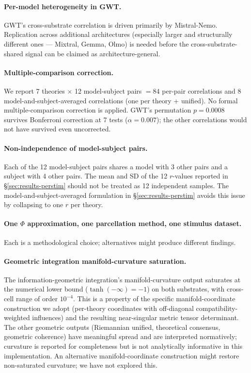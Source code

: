 \documentclass[11pt,a4paper]{article}
\begin{document}
\paragraph{Per-model heterogeneity in GWT.} GWT's cross-substrate correlation is driven primarily by Mistral-Nemo. Replication across additional architectures (especially larger and structurally different ones --- Mixtral, Gemma, Olmo) is needed before the cross-substrate-shared signal can be claimed as architecture-general.

\paragraph{Multiple-comparison correction.} We report 7 theories $\times$ 12 model-subject pairs $= 84$ per-pair correlations and 8 model-and-subject-averaged correlations (one per theory + unified). No formal multiple-comparison correction is applied. GWT's permutation $p = 0.0008$ survives Bonferroni correction at 7 tests ($\alpha = 0.007$); the other correlations would not have survived even uncorrected.

\paragraph{Non-independence of model-subject pairs.} Each of the 12 model-subject pairs shares a model with 3 other pairs and a subject with 4 other pairs. The mean and SD of the 12 $r$-values reported in \S\ref{sec:results-perstim} should not be treated as 12 independent samples. The model-and-subject-averaged formulation in \S\ref{sec:results-perstim} avoids this issue by collapsing to one $r$ per theory.

\paragraph{One $\Phi$ approximation, one parcellation method, one stimulus dataset.} Each is a methodological choice; alternatives might produce different findings.

\paragraph{Geometric integration manifold-curvature saturation.} The information-geometric integration's manifold-curvature output saturates at the numerical lower bound ($\tanh(-\infty) = -1$) on both substrates, with cross-cell range of order $10^{-4}$. This is a property of the specific manifold-coordinate construction we adopt (per-theory coordinates with off-diagonal compatibility-weighted influences) and the resulting near-singular metric tensor determinant. The other geometric outputs (Riemannian unified, theoretical consensus, geometric coherence) have meaningful spread and are interpreted normatively; curvature is reported for completeness but is not analytically informative in this implementation. An alternative manifold-coordinate construction might restore non-saturated curvature; we have not explored this.
\end{document}
